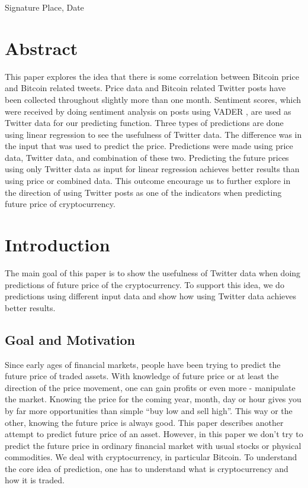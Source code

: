 \documentclass[a4paper,11pt,oneside]{article}
\begin{document}
  \vspace{20mm}

  Signature \hfill Place, Date

  \newpage

  \section*{Abstract}
  
  This paper explores the idea that there is some correlation between Bitcoin price and Bitcoin related tweets. Price data and Bitcoin related Twitter posts have been collected throughout slightly more than one month. Sentiment scores, which were received by doing sentiment analysis on posts using VADER \cite{vader}, are used as Twitter data for our predicting function. Three types of predictions are done using linear regression to see the usefulness of Twitter data. The difference was in the input that was used to predict the price. Predictions were made using price data, Twitter data, and combination of these two. Predicting the future prices using only Twitter data as input for linear regression achieves better results than using price or combined data. This outcome encourage us to further explore in the direction of using Twitter posts as one of the indicators when predicting future price of cryptocurrency.

  \newpage
  \tableofcontents

  \clearpage

  \section{Introduction}
  
  The main goal of this paper is to show the usefulness of Twitter data when doing predictions of future price of the cryptocurrency. To support this idea, we do predictions using different input data and show how using Twitter data achieves better results.
  
  \subsection{Goal and Motivation}

  Since early ages of financial markets, people have been trying to predict the future price of traded assets. With knowledge of future price or at least the direction of the price movement, one can gain profits or even more - manipulate the market. Knowing the price for the coming year, month, day or hour gives you by far more opportunities than simple “buy low and sell high”. This way or the other, knowing the future price is always good. This paper describes another attempt to predict future price of an asset. However, in this paper we don't try to predict the future price in ordinary financial market with usual stocks or physical commodities. We deal with cryptocurrency, in particular Bitcoin. To understand the core idea of prediction, one has to understand what is cryptocurrency and how it is traded.
 
\end{document}
